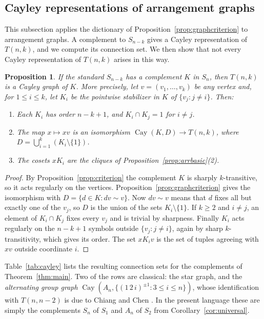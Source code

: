 \documentclass[12pt,letterpaper]{article}
\numberwithin{equation}{section}
\newtheorem{proposition}[theorem]{Proposition}
\theoremstyle{definition}
\DeclareMathOperator{\cayy}{Cay}
\begin{document}
\subsection{Cayley representations of arrangement graphs}
This subsection applies the dictionary of Proposition~\ref{prop:graphcriterion} to arrangement graphs. A complement to $S_{n-k}$ gives a Cayley representation of $T(n,k)$, and we compute its connection set. We then show that not every Cayley representation of $T(n,k)$ arises in this way.
\begin{proposition}\label{prop:arrangement}
If the standard $S_{n-k}$ has a complement $K$ in $S_n$, then $T(n,k)$ is a Cayley graph of $K$. More precisely, let $v=(v_1,\ldots,v_k)$ be any vertex and, for $1\leq i\leq k$, let $K_i$ be the pointwise stabilizer in $K$ of $\{v_j:j\neq i\}$. Then:
\begin{enumerate}
\item Each $K_i$ has order $n-k+1$, and $K_i\cap K_j=1$ for $i\neq j$.
\item The map $x\mapsto xv$ is an isomorphism $\cayy(K,D)\to T(n,k)$, where $D=\bigcup_{i=1}^k (K_i\setminus\{1\})$.
\item The cosets $xK_i$ are the cliques of Proposition~\ref{prop:arrbasic}(2).
\end{enumerate}
\end{proposition}
\begin{proof}
By Proposition~\ref{prop:criterion} the complement $K$ is sharply $k$-transitive, so it acts regularly on the vertices. Proposition~\ref{prop:graphcriterion} gives the isomorphism with $D=\{d\in K:dv\sim v\}$. Now $dv\sim v$ means that $d$ fixes all but exactly one of the $v_j$, so $D$ is the union of the sets $K_i\setminus\{1\}$. If $k\geq2$ and $i\neq j$, an element of $K_i\cap K_j$ fixes every $v_j$ and is trivial by sharpness. Finally $K_i$ acts regularly on the $n-k+1$ symbols outside $\{v_j:j\neq i\}$, again by sharp $k$-transitivity, which gives its order. The set $xK_iv$ is the set of tuples agreeing with $xv$ outside coordinate $i$.
\end{proof}
Table~\ref{tab:cayley} lists the resulting connection sets for the complements of Theorem~\ref{thm:main}. Two of the rows are classical: the star graph, and the \emph{alternating group graph} $\cayy(A_n,\{(1\,2\,i)^{\pm1}:3\leq i\leq n\})$, whose identification with $T(n,n-2)$ is due to Chiang and Chen \cite{CC98}. In the present language these are simply the complements $S_n$ of $S_1$ and $A_n$ of $S_2$ from Corollary~\ref{cor:universal}.
\end{document}
